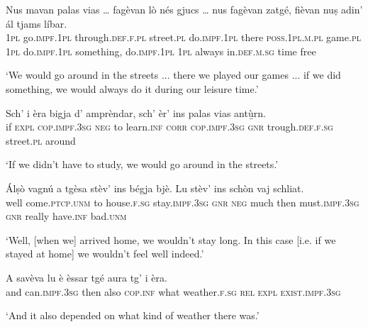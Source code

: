 \begin{linenumbers}
	\gll Nus mavan palas vias … fagèvan lò nés\footnotemark{} gjucs …  nus fagèvan zatgé, fièvan nuṣ adin’ ál tjams líbar.\\
	\textsc{1pl} go.\textsc{impf.1pl} through.\textsc{def.f.pl} street.\textsc{pl} {} do.\textsc{impf.1pl} there \textsc{poss.1pl.m.pl} game.\textsc{pl} {} \textsc{1pl} do.\textsc{impf.1pl} something, do.\textsc{impf.1pl} \textsc{1pl} always in.\textsc{def.m.sg} time free\\
\end{linenumbers}
\medskip
\glt `We would go around in the streets ... there we played our games ... if we did something, we would always do it during our leisure time.'
\medskip

\begin{linenumbers}
	\gll Sch’ i èra bigja d’ amprèndar, sch’ èr’ ins palas vias antù̱rn.   \\
	if \textsc{expl} \textsc{cop.impf.3sg} \textsc{neg} to learn.\textsc{inf} \textsc{corr} \textsc{cop.impf.3sg} \textsc{gnr} trough.\textsc{def.f.sg} street.\textsc{pl} around\\
\end{linenumbers}
\medskip
\glt `If we didn't have to study, we would go around in the streets.'
\medskip

\begin{linenumbers}
	\gll  Álṣò vagnú a tgèsa stèv’ ins bégja bjè. Lu stèv’ ins schòn vaj schliat.  \\
	well come.\textsc{ptcp.unm} to house.\textsc{f.sg} stay.\textsc{impf.3sg} \textsc{gnr} \textsc{neg} much then must.\textsc{impf.3sg} \textsc{gnr} really have.\textsc{inf} bad.\textsc{unm}\\
\end{linenumbers}
\medskip
\glt `Well, [when we] arrived home, we wouldn't stay long. In this case [i.e. if we stayed at home] we wouldn't feel well indeed.'
\medskip

\begin{linenumbers}
	\gll  A savèva lu è èssar tgé aura tg’ i èra.  \\
	and can.\textsc{impf.3sg} then also \textsc{cop.inf} what weather.\textsc{f.sg} \textsc{rel} \textsc{expl} \textsc{exist.impf.3sg}\\
\end{linenumbers}
\medskip
\glt `And it also depended on what kind of weather there was.'
\medskip

